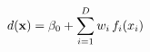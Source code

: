 \documentclass[preview]{standalone}
\begin{document}
\begin{align*}
\special{dvisvgm:raw <g id='unique000'>}d(\mathbf{x}) = \beta_0 + \sum_{i=1}^{D} w_i\, f_i(x_i)\special{dvisvgm:raw </g>}
\end{align*}
\end{document}
